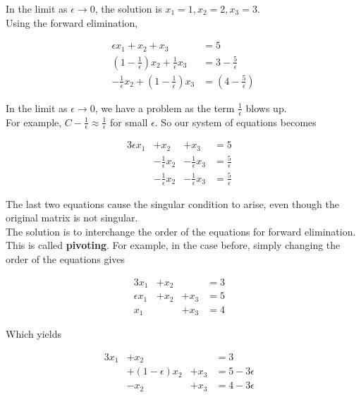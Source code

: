 \documentclass[]{article}
\begin{document}
In the limit as $\epsilon \to 0$, the solution is $x_1 = 1, x_2 = 2, x_3 = 3$.\\

Using the forward elimination,

\begin{align*}
	\epsilon x_{1} + x_{2} + x_{3} &= 5\\
	(1-\frac{1}{\epsilon})x_{2} + \frac{1}{\epsilon}x_{3} &= 3-\frac{5}{\epsilon}\\
	-\frac{1}{\epsilon}x_{2} + (1-\frac{1}{\epsilon})x_{3} &= (4-\frac{5}{\epsilon})
\end{align*}

In the limit as $\epsilon \to 0$, we have a problem as the term $\frac{1}{\epsilon}$ blows up.\\

For example, $C - \frac{1}{\epsilon} \approx \frac{1}{\epsilon}$ for small $\epsilon$. So our system of equations becomes

\begin{alignat*}{3}
	\epsilon x_{1}& + x_{2}& + x_{3}& = 5&\\
	& -\frac{1}{\epsilon}x_{2}& - \frac{1}{\epsilon}x_{3}& = \frac{5}{\epsilon}&\\
	& -\frac{1}{\epsilon}x_{2}& -\frac{1}{\epsilon}x_{3}& = \frac{5}{\epsilon}&
\end{alignat*}

The last two equations cause the singular condition to arise, even though the original matrix is not singular.\\

The solution is to interchange the order of the equations for forward elimination. This is called \textbf{pivoting}. For example, in the case before, simply changing the order of the equations gives

\begin{alignat*}{3}
	x_{1}& + x_{2}& & = 3&\\
	\epsilon x_{1}& + x_{2}& + x_{3}& = 5&\\
	x_{1}& & + x_{3}& = 4&
\end{alignat*}

Which yields

\begin{alignat*}{3}
	x_{1}& + x_{2}& & = 3&\\
	& + (1-\epsilon)x_{2}& + x_{3}& = 5-3\epsilon&\\
	& -x_{2}& + x_{3}& = 4-3\epsilon&
\end{alignat*}
\end{document}

